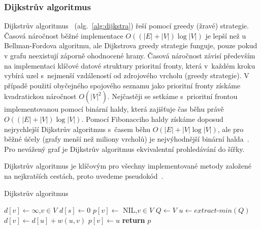 \documentclass{bakalarka}
\begin{document}
\subsubsection{Dijkstrův algoritmus}
Dijkstrův algoritmus~\citep{dijkstra1959} (alg.~\ref{alg:dijkstra}) řeší
 pomocí greedy (žravé) strategie.
Časová náročnost běžné implementace $O((|E| + |V|)\log|V|)$ je lepší než u
Bellman-Fordova algoritmu, ale Dijkstrova greedy strategie funguje, pouze pokud
v grafu neexistují záporně ohodnocené hrany. Časová náročnost závisí především
na implementaci klíčové datové struktury prioritní fronty, která v~každém kroku
vybírá uzel s~nejmenší vzdáleností od zdrojového vrcholu (greedy strategie). V
případě použití obyčejného spojového seznamu jako prioritní fronty získáme
kvadratickou náročnost $O(|V|^2)$. Nejčastěji se setkáme s~prioritní frontou
implementovanou pomocí binární haldy, která zajišťuje čas běhu právě $O((|E| +
|V|)\log|V|)$.  Pomocí Fibonacciho haldy získáme doposud nejrychlejší Dijkstrův
algoritmus s~časem běhu $O(|E| + |V| \log|V|)$, ale pro běžné účely (grafy
menší než miliony vrcholů) je nejvýhodnější binární
halda~\citep{CLRS,fredmantarjan}. Pro nevážený graf je Dijkstrův algoritmus
ekvivalentní prohledávání do šířky.

Dijkstrův algoritmus je klíčovým pro všechny implementované metody založené na
nejkratších cestách, proto uvedeme pseudokód~\citep{CLRS}.

\begin{center}
\begin{minipage}{\textwidth}
\begin{algorithm}[H]
	\caption{Dijkstrův algoritmus}
		\label{alg:dijkstra}
	\begin{algorithmic}[1]
	\Statex
	  
		\State $d[v] \gets \infty$,$v \in V$
		\State $d[s] \gets 0$
		\State $p[v] \gets $ NIL,$v \in V$
		\State $Q \gets V$
			\State $u \gets extract\mbox{-}min(Q)$
					\State $d[v] \gets d[u] + w(u, v)$
					\State $p[v] \gets u$
				\EndIf
			\EndFor
		\EndWhile
		\State \textbf{return} $p$
	\EndFunction
	\end{algorithmic}
\end{algorithm}
\end{minipage}
\end{center}
\mbox{}
\end{document}
